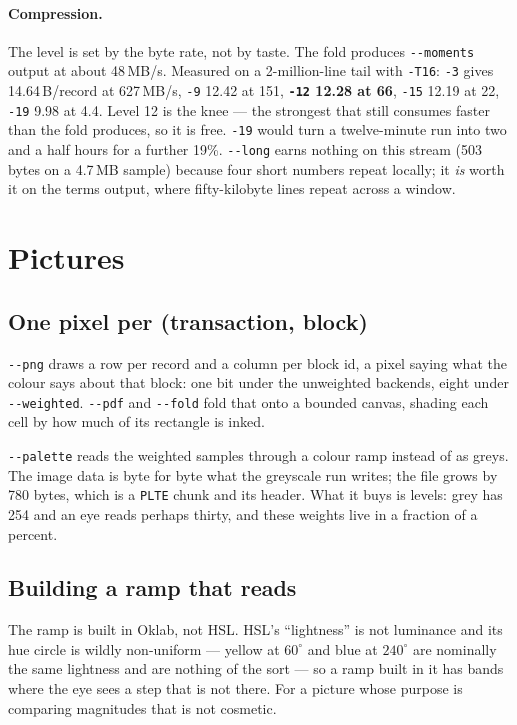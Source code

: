 \documentclass[11pt,a4paper]{article}
\newcommand{\flag}[1]{\texttt{-{}-#1}}
\begin{document}
\paragraph{Compression.} The level is set by the byte rate, not by taste. The
fold produces \flag{moments} output at about 48\,MB/s. Measured on a
2-million-line tail with \texttt{-T16}: \texttt{-3} gives 14.64\,B/record at
627\,MB/s, \texttt{-9} 12.42 at 151, \textbf{\texttt{-12} 12.28 at 66},
\texttt{-15} 12.19 at 22, \texttt{-19} 9.98 at 4.4. Level 12 is the knee --- the
strongest that still consumes faster than the fold produces, so it is free.
\texttt{-19} would turn a twelve-minute run into two and a half hours for a
further 19\%. \texttt{-{}-long} earns nothing on this stream (503 bytes on a
4.7\,MB sample) because four short numbers repeat locally; it \emph{is} worth it
on the terms output, where fifty-kilobyte lines repeat across a window.

\section{Pictures}

\subsection{One pixel per (transaction, block)}

\flag{png} draws a row per record and a column per block id, a pixel saying what
the colour says about that block: one bit under the unweighted backends, eight
under \flag{weighted}. \flag{pdf} and \flag{fold} fold that onto a bounded
canvas, shading each cell by how much of its rectangle is inked.

\flag{palette} reads the weighted samples through a colour ramp instead of as
greys. The image data is byte for byte what the greyscale run writes; the file
grows by 780 bytes, which is a \texttt{PLTE} chunk and its header. What it buys
is levels: grey has 254 and an eye reads perhaps thirty, and these weights live
in a fraction of a percent.

\subsection{Building a ramp that reads}

The ramp is built in Oklab, not HSL. HSL's ``lightness'' is not luminance and
its hue circle is wildly non-uniform --- yellow at $60^\circ$ and blue at
$240^\circ$ are nominally the same lightness and are nothing of the sort --- so a
ramp built in it has bands where the eye sees a step that is not there. For a
picture whose purpose is comparing magnitudes that is not cosmetic.
\end{document}
